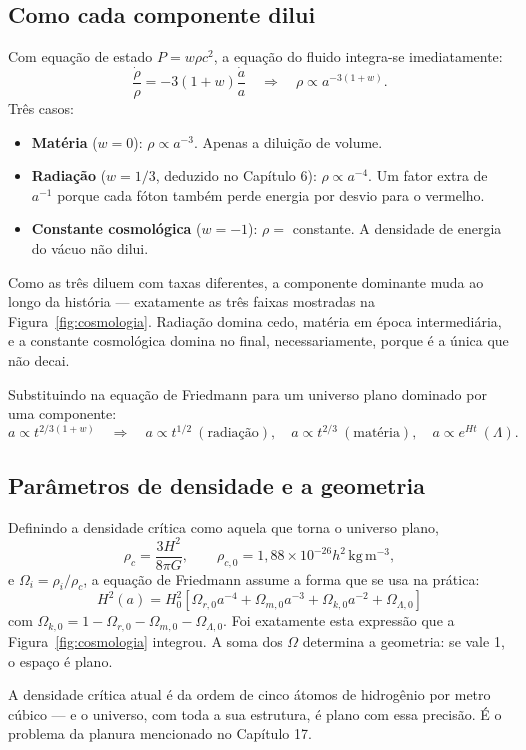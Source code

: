 \documentclass[11pt,a4paper]{article}
\begin{document}
\subsection*{Como cada componente dilui}

Com equação de estado $P=w\rho c^{2}$, a equação do fluido integra-se imediatamente:
\[
\frac{\dot{\rho}}{\rho}=-3(1+w)\frac{\dot{a}}{a}
\quad\Longrightarrow\quad
\rho\propto a^{-3(1+w)}.
\]
Três casos:
\begin{itemize}
\item \textbf{Matéria} ($w=0$): $\rho\propto a^{-3}$. Apenas a diluição de volume.
\item \textbf{Radiação} ($w=1/3$, deduzido no Capítulo 6): $\rho\propto a^{-4}$. Um fator extra de $a^{-1}$ porque cada fóton também perde energia por desvio para o vermelho.
\item \textbf{Constante cosmológica} ($w=-1$): $\rho=$ constante. A densidade de energia do vácuo não dilui.
\end{itemize}
Como as três diluem com taxas diferentes, a componente dominante muda ao longo da história --- exatamente as três faixas mostradas na Figura~\ref{fig:cosmologia}. Radiação domina cedo, matéria em época intermediária, e a constante cosmológica domina no final, necessariamente, porque é a única que não decai.

Substituindo na equação de Friedmann para um universo plano dominado por uma componente:
\[
a\propto t^{2/3(1+w)}
\quad\Longrightarrow\quad
a\propto t^{1/2}\ (\text{radiação}),\quad
a\propto t^{2/3}\ (\text{matéria}),\quad
a\propto e^{Ht}\ (\Lambda).
\]

\subsection*{Parâmetros de densidade e a geometria}

Definindo a densidade crítica como aquela que torna o universo plano,
\[
\rho_c=\frac{3H^{2}}{8\pi G},
\qquad
\rho_{c,0}=1{,}88\times10^{-26}h^{2}\,\mathrm{kg\,m^{-3}},
\]
e $\Omega_i=\rho_i/\rho_c$, a equação de Friedmann assume a forma que se usa na prática:
\[
\boxed{\ H^{2}(a)=H_0^{2}\left[\Omega_{r,0}a^{-4}+\Omega_{m,0}a^{-3}+\Omega_{k,0}a^{-2}+\Omega_{\Lambda,0}\right]\ }
\]
com $\Omega_{k,0}=1-\Omega_{r,0}-\Omega_{m,0}-\Omega_{\Lambda,0}$. Foi exatamente esta expressão que a Figura~\ref{fig:cosmologia} integrou. A soma dos $\Omega$ determina a geometria: se vale 1, o espaço é plano.

A densidade crítica atual é da ordem de cinco átomos de hidrogênio por metro cúbico --- e o universo, com toda a sua estrutura, é plano com essa precisão. É o problema da planura mencionado no Capítulo 17.
\end{document}
